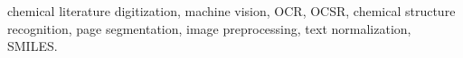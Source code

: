 chemical literature digitization, machine vision, OCR, OCSR, chemical structure recognition, page segmentation, image preprocessing, text normalization, SMILES.
